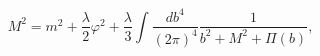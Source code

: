\begin{equation}
M^{2}=m^{2}+\dfrac{\lambda}{2}\varphi^{2}+\frac{\lambda}{3}\int
\frac{db^{4}}{(2\pi)^{4}}
\frac{1}{b^{2}+M^{2}+\Pi(b)},\label{pieo}%
\end{equation}

